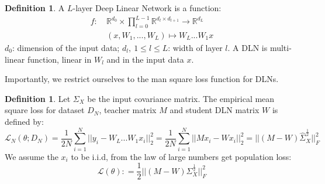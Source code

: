 \documentclass{article}
\theoremstyle{definition}
\newtheorem{definition}[theorem]{Definition}
\begin{document}
\begin{definition}
A $L$-layer Deep Linear Network is a function:
\begin{align*}
    f: \ & \mathbb{R}^{d_0} \times \prod_{l=0}^{L-1}\mathbb{R}^{d_l \times d_{l+1}}  \to \mathbb{R}^{d_L} \\
       & (x,W_1,...,W_L) \mapsto W_L...W_1 x
\end{align*}
$d_0$: dimension of the input data; $d_l,\ 1\leq l \leq L$: width of layer $l$. A DLN is multi-linear function, linear in $W_l$ and in the input data $x$.
\end{definition}
Importantly, we restrict ourselves to the man square loss function for DLNs. 
\begin{definition}
Let $\Sigma_X$ be the input covariance matrix. The empirical mean square loss for dataset $D_N$, teacher matrix $M$ and student DLN matrix $W$ is defined by:
\begin{equation*}
    \mathcal{L}_N(\theta; D_N) = \frac{1}{2N} \sum_{i=1}^{N} ||y_i - W_L...W_1x_i||_2^2 = \frac{1}{2N} \sum_{i=1}^{N} ||Mx_i - Wx_i||_2^2 = ||(M - W)\hat{\Sigma}_X^{\frac{1}{2}}||^2_F
\end{equation*}
We assume the $x_i$ to be i.i.d, from the law of large numbers get population loss:
\begin{equation*}
    \mathcal{L}(\theta) : = \frac{1}{2} ||(M - W)\Sigma_X^{\frac{1}{2}}||^2_F
\end{equation*}
\end{definition}
\end{document}
